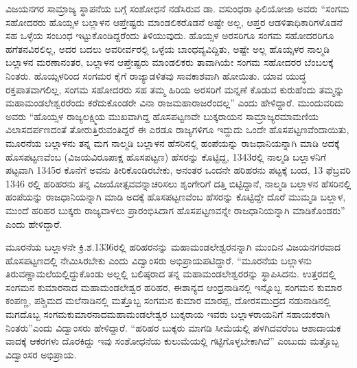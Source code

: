 ವಿಜಯನಗರ ಸಾಮ್ರಾಜ್ಯ ಸ್ಥಾಪನೆಯ ಬಗ್ಗೆ ಸಂಶೋಧನೆ ನಡೆಸಿರುವ ಡಾ. ವಸುಂಧರಾ ಫಿಲಿಯೋಜಾ ಅವರು “ಸಂಗಮ ಸಹೋದರರು ಹೊಯ್ಸಳ ಬಲ್ಲಾಳನ ಆಪ್ತೇಷ್ಟರು ಮಾಂಡಲಿಕರೊಡನೆ ಅಷ್ಟೇ ಅಲ್ಲ, ಆಪ್ತರ ಆಡಳಿತಾಧಿಕಾರಿಗಳೊಡನೆ ಸಹ ಒಳ್ಳೆಯ ಸಂಬಂಧ ಇಟ್ಟುಕೊಂಡಿದ್ದರೆಂದು ತಿಳಿಯುವುದು. ಹೊಯ್ಸಳ ಅರಸರಿಗೂ ಸಂಗಮ ಸಹೋದರರಿಗೂ ಹಗೆತನವಿರಲಿಲ್ಲ, ಅದರ ಬದಲು ಅವರೀರ್ವರಲ್ಲಿ ಒಳ್ಳೆಯ ಬಾಂಧವ್ಯವಿದ್ದಿತು, ಅಷ್ಟೇ ಅಲ್ಲ ಹೊಯ್ಸಳರ ನಾಲ್ಮಡಿ ಬಲ್ಲಾಳನ ಮರಣಾನಂತರ, ಬಲ್ಲಾಳನ ಆಪ್ತೇಷ್ಟರು ಮಾಂಡಲಿಕರು ತಾವಾಗಿಯೇ ಸಂಗಮ ಸಹೋದರರ ಬೆಂಬಲಕ್ಕೆ ನಿಂತರು. ಹೊಯ್ಸಳರಿಂದ ಸಂಗಮರ ಕೈಗೆ ರಾಜ್ಯಾಡಳಿತವು ಸಾವಕಾಶವಾಗಿ ಹೋಯಿತು. ಯಾವ ಯುದ್ಧ ರಕ್ತಪಾತವಾಗಲಿಲ್ಲ, ಸಂಗಮ ಸಹೋದರರು ಸಹ ತಮ್ಮ ಹಿರಿಯ ಅರಸರಿಗೆ ಮನ್ನಣೆ ಕೊಡುವ ಕುರುಹೆಂದು ತಮ್ಮನ್ನು ಮಹಾಮಂಡಲೇಶ್ವರರೆಂದು ಕರೆದುಕೊಂಡರೇ ವಿನಾ ರಾಜಮಹಾರಾಜರೆಂದಲ್ಲ” ಎಂದು ಹೇಳಿದ್ದಾರೆ. ಮುಂದುವರಿದು ಅವರು “ಹೊಯ್ಸಳ ರಾಜ್ಯಲಕ್ಷ್ಮಿಯ ಮುಖವಾಗಿದ್ದ ಹೊಸಪಟ್ಟಣವೇ ಬುಕ್ಕರಾಯನ ಸಾಮ್ರಾಜ್ಯರಮಾಮಣಿಯ ವಿಲಾಸದರ್ಪಣದಂತೆ ತೋರುತ್ತಿರುವಂತಿದ್ದರೆ ಈ ಎರಡೂ ರಾಜ್ಯಗಳಿಗೂ ಇದ್ದುದು ಒಂದೇ ಹೊಸಪಟ್ಟಣವೆಂದಾಯಿತು, ಮೂರನೆಯ ಬಲ್ಲಾಳನು ತನ್ನ ಮಗ ನಾಲ್ಮಡಿ ಬಲ್ಲಾಳನ ಹೆಸರಿನಲ್ಲಿ ಹಂಪೆಯನ್ನು ರಾಜಧಾನಿಯನ್ನಾಗಿ ಮಾಡಿ ಅದಕ್ಕೆ ಹೊಸಪಟ್ಟಣವೆಂಬ (ವಿಜಯವಿರೂಪಾಕ್ಷ ಹೊಸಪಟ್ಟಣ) ಹೆಸರನ್ನು ಕೊಟ್ಟಿದ್ದ, 1343ರಲ್ಲಿ ನಾಲ್ಮಡಿ ಬಲ್ಲಾಳನಿಗೆ ಪಟ್ಟವಾಗಿ 1345ರ ಕೊನೆಗೆ ಅವನು ತೀರಿಕೊಂಡಿರಬೇಕು, ಅನಂತರ ಒಂದನೇ ಹರಿಹರನು ಪಟ್ಟಕ್ಕೆ ಬಂದ, 13 ಫೆಬ್ರವರಿ 1346 ರಲ್ಲಿ ಹರಿಹರನು ತನ್ನ ವಿಜಯೋತ್ಸವವನ್ನಾಚರಿಸಲು ಶೃಂಗೇರಿಗೆ ದತ್ತಿ ಬಿಟ್ಟಿದ್ದಾನೆ, ನಾಲ್ಮಡಿ ಬಲ್ಲಾಳನ ಹೆಸರಿನಲ್ಲಿ ಹಂಪೆಯನ್ನು ರಾಜಧಾನಿಯನ್ನಾಗಿ ಮಾಡಿ ಅದಕ್ಕೆ ಹೊಸಪಟ್ಟಣವೆಂಬ ಹೆಸರನ್ನು ಕೊಟ್ಟಿದ್ದೇ ದೊರೆ ಮುಮ್ಮಡಿ ಬಲ್ಲಾಳ, ಮುಂದೆ ಹರಿಹರ ಬುಕ್ಕರು ರಾಜ್ಯವಾಳಲು ಪ್ರಾರಂಭಿಸಿದಾಗ ಹೊಸಪಟ್ಟಣವನ್ನೇ ರಾಜಧಾನಿಯನ್ನಾಗಿ ಮಾಡಿಕೊಂಡರು” ಎಂದು ಹೇಳಿದ್ದಾರೆ.

ಮೂರನೆಯ ಬಲ್ಲಾಳನೇ ಕ್ರಿ.ಶ.1336ರಲ್ಲಿ ಹರಿಹರನನ್ನು ಮಹಾಮಂಡಲೇಶ್ವರನನ್ನಾಗಿ ಮುಂದಿನ ವಿಜಯನಗರವಾದ ಹೊಸಪಟ್ಟಣದಲ್ಲಿ ನೇಮಿಸಿರಬೇಕು ಎಂದು ವಿದ್ವಾಂಸರು ಅಭಿಪ್ರಾಯಪಟಿದ್ದಾರೆ. “ಮೂರನೆಯ ಬಲ್ಲಾಳನು ತಿರುವಣ್ಣಾಮಲೆ\-ಯಲ್ಲಿದ್ದುಕೊಂಡು ಅಲ್ಲಲ್ಲಿ ಬಲಿಷ್ಠರಾದ ತನ್ನ ಮಹಾಮಂಡಲೇಶ್ವರರನ್ನು ಸ್ಥಾಪಿಸಿದನು. ಉತ್ತರದಲ್ಲಿ ಸಂಗಮನ ಕುಮಾರನಾದ ಮಹಾಮಂಡಲೇಶ್ವರ ಹರಿಹರ, ಈಶಾನ್ಯದ ಆಂಧ್ರನಾಡಿನಲ್ಲಿ ಇನ್ನೊಬ್ಬ ಸಂಗಮನ ಕುಮಾರ ಕಂಪಣ್ಣ, ಪಶ್ಚಿಮದ ಮಲೆನಾಡಿನಲ್ಲಿ ಮತ್ತೊಬ್ಬ ಸಂಗಮನ ಕುಮಾರ ಮಾರಪ್ಪ, ದೋರಸಮುದ್ರದ ನಡುನಾಡಿನಲ್ಲಿ ಮಗದೊಬ್ಬ ಸಂಗಮಕುಮಾರನಾದ\break ಮಹಾಮಂಡಲೇಶ್ವರ ಬುಕ್ಕರಾಯ ಇವರು ಬಲ್ಲಾಳರಾಯನಿಗೆ ಸಹಾಯಕರಾಗಿ ನಿಂತರು”ಎಂದು ವಿದ್ವಾಂಸರು ಹೇಳಿದ್ದಾರೆ. “ಹರಿಹರ ಬುಕ್ಕರು ಮಾಗಡಿ ಸೀಮೆಯಲ್ಲಿ ಪಳಗಿದವರೆಂಬ ಆಶಾದಾಯಕ ವಾದಕ್ಕೆ ಆಕರಗಳು ದೊರಕಿದ್ದು ಇವು ಸಂಶೋಧನೆಯ ಕುಲುಮೆಯಲ್ಲಿ ಗಟ್ಟಿಗೊಳ್ಳಬೇಕಾಗಿದೆ” ಎಂಬುದು ಮತ್ತೊಬ್ಬ ವಿದ್ವಾಂಸರ ಅಭಿಪ್ರಾಯ.

